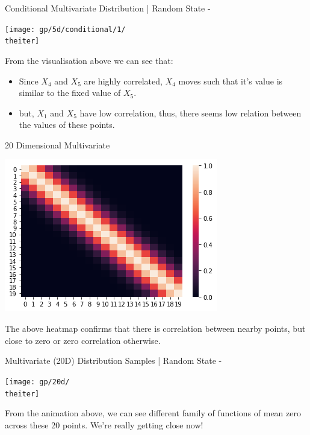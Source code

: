 \documentclass{beamer}
\begin{document}
%
{%
	\begin{frame}{Conditional Multivariate Distribution | Random State - \theiter}
		\begin{center}
			\texttt{[image: gp/5d/conditional/1/\\theiter]}
		\end{center}
		From the visualisation above we can see that:
		\begin{itemize}
			\item Since $X_4$ and $X_5$ are highly correlated, $X_4$ moves such that it's value is similar to the fixed value of $X_5$.
			\item but, $X_1$ and $X_5$ have low correlation, thus, there seems low relation between the values of these points.
		\end{itemize}
	\end{frame}
}

\begin{frame}{20 Dimensional Multivariate}
	\begin{center}
		\includegraphics[width=\linewidth, height=\textheight -120pt ,keepaspectratio]{gp/20d}\\
	\end{center}	
	The above heatmap confirms that there is correlation between nearby points, but close to zero or zero correlation otherwise.
\end{frame}

%
{%
	\begin{frame}{Multivariate (20D) Distribution Samples | Random State - \theiter}
		\begin{center}
			\texttt{[image: gp/20d/\\theiter]}
		\end{center}
		From the animation above, we can see different family of functions of mean zero across these 20 points. We're really getting close now!
	\end{frame}
}
\end{document}
